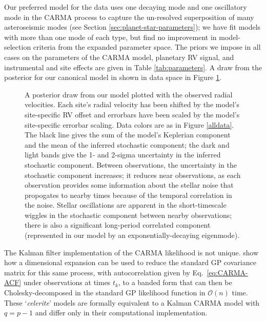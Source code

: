 \documentclass[modern]{aastex61}
\begin{document}
Our preferred model for the data uses one decaying mode and one oscillatory mode
in the CARMA process to capture the un-resolved superposition of many
asteroseismic modes (see Section \ref{sec:planet-star-parameters}); we have fit
models with more than one mode of each type, but find no improvement in
model-selection criteria from the expanded parameter space.  The priors we
impose in all cases on the parameters of the CARMA model, planetary RV signal,
and instrumental and site effects are given in Table \ref{tab:parameters}.  A
draw from the posterior for our canonical model in shown in data space in Figure
\ref{fig:data-space}.

\begin{figure}

\caption{\label{fig:data-space} A posterior draw from our model plotted with the
observed radial velocities.  Each site's radial velocity has been shifted by the
model's site-specific RV offset and errorbars have been scaled by the model's
site-specific errorbar scaling.  Data colors are as in Figure \ref{alldata}.
The black line gives the sum of the model's Keplerian component and the mean of
the inferred stochastic component; the dark and light bands give the 1- and
2-sigma uncertainty in the inferred stochastic component.  Between observations,
the uncertainty in the stochastic component increases; it reduces near
observations, as each observation provides some information about the stellar
noise that propogates to nearby times because of the temporal correlation in the
noise.  Stellar oscillations are apparent in the short-timescale wiggles in the
stochastic component between nearby observations; there is also a significant
long-period correlated component (represented in our model by an
exponentially-decaying eigenmode).}

\end{figure}

The Kalman filter implementation of the CARMA likelihood is not unique.
\citet{Foreman-Mackey2017} show how a dimensional expansion can be used to
reduce the standard GP covariance matrix for this same process,  with
autocorrelation given by Eq.\ \eqref{eq:CARMA-ACF} under observations at times
$t_k$, to a banded form that can then be Cholesky-decomposed in the standard GP
likelihood function in $\mathcal{O}\left( n \right)$ time. These
`\emph{celerite}' models are formally equivalent to a Kalman CARMA model with $q
= p-1$ and differ only in their computational implementation.
\end{document}
